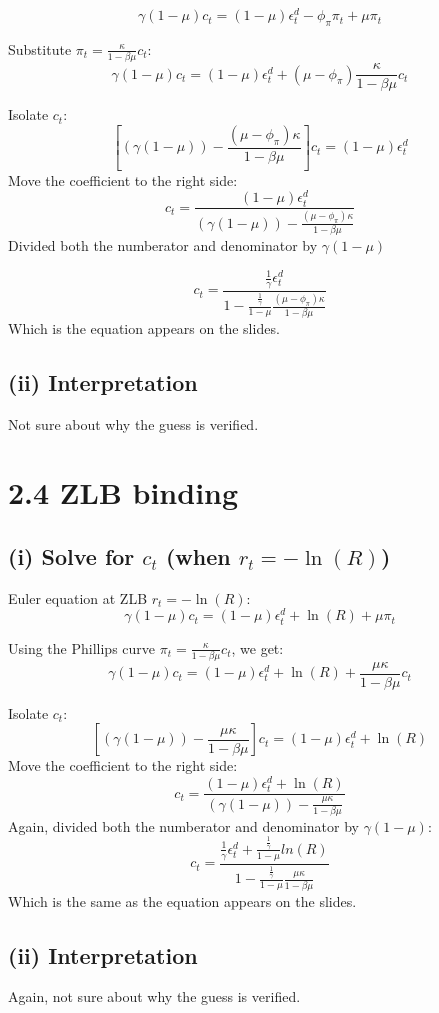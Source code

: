 \documentclass{article}
\begin{document}
\[
\gamma(1 - \mu)c_t = (1 - \mu)\epsilon_t^d - \phi_{\pi}\pi_t + \mu \pi_t
\]

Substitute \(\pi_t = \frac{\kappa}{1-\beta\mu} c_t\):
\[
\gamma(1 - \mu)c_t = (1 - \mu)\epsilon_t^d + (\mu - \phi_{\pi})\frac{\kappa}{1 - \beta\mu} c_t
\]

Isolate \(c_t\):
\[
\left[(\gamma(1-\mu))-\frac{(\mu-\phi_\pi)\kappa}{1-\beta \mu}\right]c_t=  (1 - \mu)\epsilon_t^d
\]
Move the coefficient to the right side:
\[
c_t = \frac{(1 - \mu)\epsilon_t^d}{(\gamma(1-\mu))-\frac{(\mu-\phi_\pi)\kappa}{1-\beta \mu}}
\]
Divided both the numberator and denominator by $\gamma(1-\mu)$

\[
c_t=\frac{\frac{1}{\gamma}\epsilon_t^d}{1 - \frac{\frac{1}{\gamma}}{1-\mu}\frac{(\mu-\phi_\pi)\kappa}{1 - \beta\mu}}
\]
Which is the equation appears on the slides.
\subsection*{(ii) Interpretation}
Not sure about why the guess is verified.

\section*{2.4 ZLB binding}

\subsection*{(i) Solve for \(c_t\) (when \(r_t = -\ln(R)\))}

Euler equation at ZLB \(r_t = -\ln(R)\):
\[
\gamma(1 - \mu)c_t = (1 - \mu)\epsilon_t^d + \ln(R) + \mu \pi_t
\]

Using the Phillips curve \(\pi_t = \frac{\kappa}{1-\beta\mu} c_t\), we get:
\[
\gamma(1 - \mu)c_t = (1 - \mu)\epsilon_t^d + \ln(R) + \frac{\mu\kappa}{1-\beta\mu} c_t
\]

Isolate \(c_t\):
\[
\left[(\gamma(1-\mu))-\frac{\mu\kappa}{1-\beta\mu}\right]c_t=  (1 - \mu)\epsilon_t^d + \ln(R)
\]
Move the coefficient to the right side:
\[
c_t = \frac{(1 - \mu)\epsilon_t^d + \ln(R)}{(\gamma(1-\mu))-\frac{\mu\kappa}{1-\beta\mu}}
\]
Again, divided both the numberator and denominator by $\gamma(1-\mu)$:
\[
c_t=\frac{\frac{1}{\gamma}\epsilon_t^d + \frac{\frac{1}{\gamma}}{1-\mu}ln(R)}{1 - \frac{\frac{1}{\gamma}}{1-\mu}\frac{\mu\kappa}{1 - \beta\mu}}
\]
Which is the same as the equation appears on the slides.
\subsection*{(ii) Interpretation}
Again, not sure about why the guess is verified.
\end{document}

